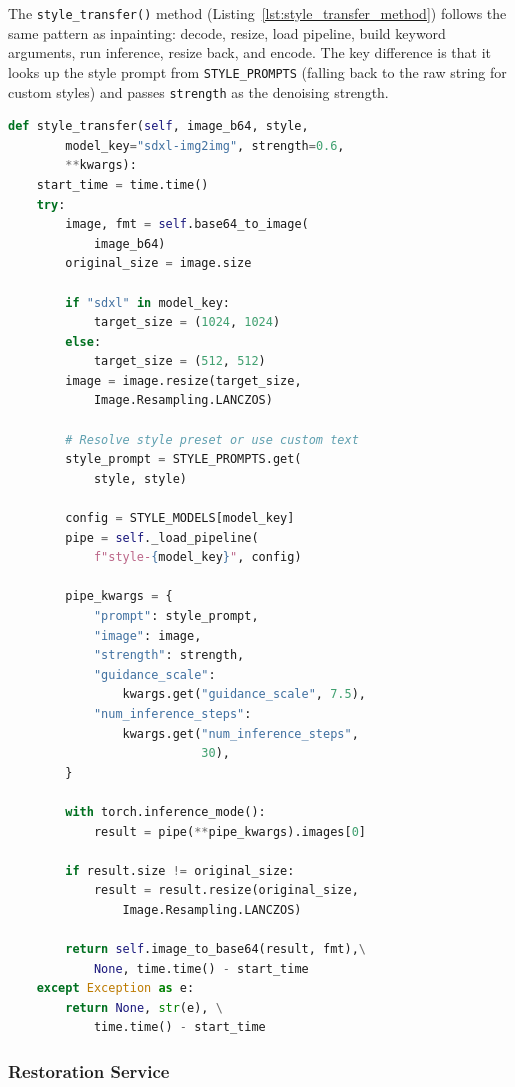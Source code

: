 \documentclass[12pt,a4paper]{report}
\begin{document}
The \texttt{style\_transfer()} method (Listing~\ref{lst:style_transfer_method}) follows the same pattern as inpainting: decode, resize, load pipeline, build keyword arguments, run inference, resize back, and encode. The key difference is that it looks up the style prompt from \texttt{STYLE\_PROMPTS} (falling back to the raw string for custom styles) and passes \texttt{strength} as the denoising strength.

\begin{lstlisting}[language=Python, caption={Style transfer inference method (\texttt{diffusion.py})}, label={lst:style_transfer_method}]
def style_transfer(self, image_b64, style,
        model_key="sdxl-img2img", strength=0.6,
        **kwargs):
    start_time = time.time()
    try:
        image, fmt = self.base64_to_image(
            image_b64)
        original_size = image.size

        if "sdxl" in model_key:
            target_size = (1024, 1024)
        else:
            target_size = (512, 512)
        image = image.resize(target_size,
            Image.Resampling.LANCZOS)

        # Resolve style preset or use custom text
        style_prompt = STYLE_PROMPTS.get(
            style, style)

        config = STYLE_MODELS[model_key]
        pipe = self._load_pipeline(
            f"style-{model_key}", config)

        pipe_kwargs = {
            "prompt": style_prompt,
            "image": image,
            "strength": strength,
            "guidance_scale":
                kwargs.get("guidance_scale", 7.5),
            "num_inference_steps":
                kwargs.get("num_inference_steps",
                           30),
        }

        with torch.inference_mode():
            result = pipe(**pipe_kwargs).images[0]

        if result.size != original_size:
            result = result.resize(original_size,
                Image.Resampling.LANCZOS)

        return self.image_to_base64(result, fmt),\
            None, time.time() - start_time
    except Exception as e:
        return None, str(e), \
            time.time() - start_time
\end{lstlisting}

\subsubsection{Restoration Service}
\label{sec:restoration_service}
\end{document}
